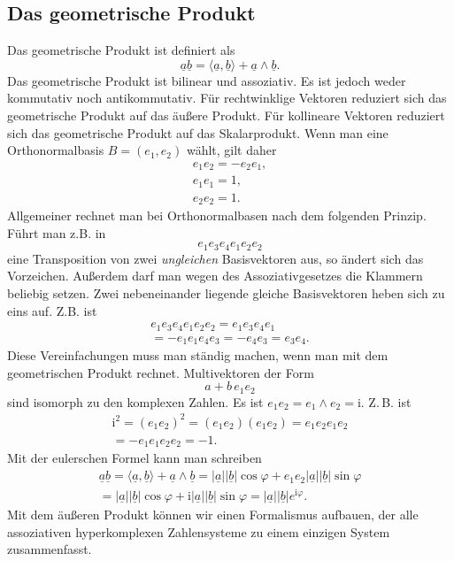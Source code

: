 \documentclass[a4paper,10pt,fleqn,twocolumn,twoside]{article}
\newcommand{\ui}{\mathrm i}
\newcommand{\uv}[1]{\underline{#1}}
\begin{document}
\subsection{Das geometrische Produkt}

Das geometrische Produkt ist definiert als
\[\uv a\uv b =
\langle\uv a,\uv b\rangle
+\uv a\wedge\uv b.\]
\noindent
Das geometrische Produkt ist bilinear und assoziativ. Es ist jedoch
weder kommutativ noch antikommutativ.
Für rechtwinklige Vektoren reduziert sich das geometrische Produkt
auf das äußere Produkt. Für kollineare Vektoren reduziert sich das
geometrische Produkt auf das Skalarprodukt.
Wenn man eine Orthonormalbasis $B=(e_1,e_2)$ wählt, gilt daher
\begin{gather*}
e_1e_2 = -e_2e_1,\\
e_1e_1=1,\\
e_2e_2=1.
\end{gather*}
\noindent
Allgemeiner rechnet man bei Orthonormalbasen nach dem folgenden
Prinzip. Führt man z.B. in
\[e_1e_3e_4e_1e_2e_2\]
eine Transposition von zwei \textit{ungleichen} Basisvektoren aus,
so ändert sich das Vorzeichen. Außerdem darf
man wegen des Assoziativgesetzes die Klammern beliebig setzen.
Zwei nebeneinander liegende gleiche Basisvektoren heben sich zu
eins auf. Z.B. ist
\begin{gather*}
e_1e_3e_4e_1e_2e_2 = e_1e_3e_4e_1\\
= -e_1e_1e_4e_3 = -e_4e_3 = e_3e_4.
\end{gather*}
Diese Vereinfachungen muss man ständig machen, wenn man mit dem
geometrischen Produkt rechnet. Multivektoren der Form
\[a+b\,e_1e_2\]
sind isomorph zu den komplexen Zahlen.
Es ist $e_1e_2 = e_1\wedge e_2 = \ui$. Z.\,B. ist
\begin{gather*}
\ui^2 = (e_1e_2)^2 = (e_1e_2)(e_1e_2) = e_1e_2e_1e_2\\
= -e_1e_1e_2e_2 = -1.
\end{gather*}
\noindent
Mit der eulerschen Formel kann man schreiben
\begin{gather*}
\underline a\underline b =
\langle\underline a,\underline b\rangle
+\underline a\wedge\underline b
= |\underline a||\underline b|\cos\varphi
+ e_1e_2|\underline a||\underline b|\sin\varphi\\
= |\underline a||\underline b|\cos\varphi
+ \ui|\underline a||\underline b|\sin\varphi
= |\underline a||\underline b|e^{\ui\varphi}.
\end{gather*}
\noindent
Mit dem äußeren Produkt können wir einen Formalismus aufbauen,
der alle assoziativen hyperkomplexen Zahlensysteme zu einem
einzigen System zusammenfasst.
\end{document}
